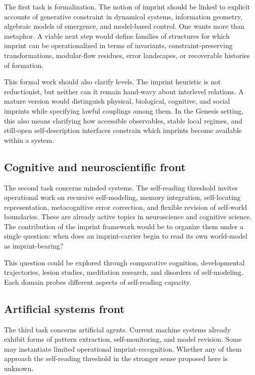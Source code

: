 \documentclass[12pt,a4paper]{article}
\begin{document}
The first task is formalization. The notion of imprint should be linked to explicit accounts of generative constraint in dynamical systems, information geometry, algebraic models of emergence, and model-based control. One wants more than metaphor. A viable next step would define families of structures for which imprint can be operationalized in terms of invariants, constraint-preserving transformations, modular-flow residues, error landscapes, or recoverable histories of formation.

This formal work should also clarify levels. The imprint heuristic is
not reductionist, but neither can it remain hand-wavy about interlevel
relations. A mature version would distinguish physical, biological,
cognitive, and social imprints while specifying lawful couplings among
them. In the Genesis setting, this also means clarifying how accessible
observables, stable local regimes, and still-open self-description
interfaces constrain which imprints become available within a system.

\subsection{Cognitive and neuroscientific front}

The second task concerns minded systems. The self-reading threshold invites operational work on recursive self-modeling, memory integration, self-locating representation, metacognitive error correction, and flexible revision of self-world boundaries. These are already active topics in neuroscience and cognitive science. The contribution of the imprint framework would be to organize them under a single question: when does an imprint-carrier begin to read its own world-model as imprint-bearing?

This question could be explored through comparative cognition, developmental trajectories, lesion studies, meditation research, and disorders of self-modeling. Each domain probes different aspects of self-reading capacity.

\subsection{Artificial systems front}

The third task concerns artificial agents. Current machine systems already exhibit forms of pattern extraction, self-monitoring, and model revision. Some may instantiate limited operational imprint-recognition. Whether any of them approach the self-reading threshold in the stronger sense proposed here is unknown.
\end{document}
